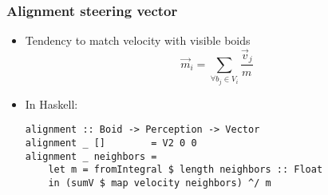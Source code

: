 \documentclass{beamer}
\begin{document}
\begin{frame}[fragile]
    \frametitle{\huge{Alignment steering vector}\normalsize}
    \begin{itemize}
    \item Tendency to match velocity with visible boids
    \begin{equation}
    \vec{m}_i = \sum\limits_{\forall b_j \in V_i} \frac{\vec{v}_j}{m}
    \end{equation}
    \item In Haskell:
    \begin{verbatim}
alignment :: Boid -> Perception -> Vector
alignment _ []        = V2 0 0
alignment _ neighbors =
    let m = fromIntegral $ length neighbors :: Float
    in (sumV $ map velocity neighbors) ^/ m
    \end{verbatim}
    \end{itemize}

\end{frame}
\end{document}

